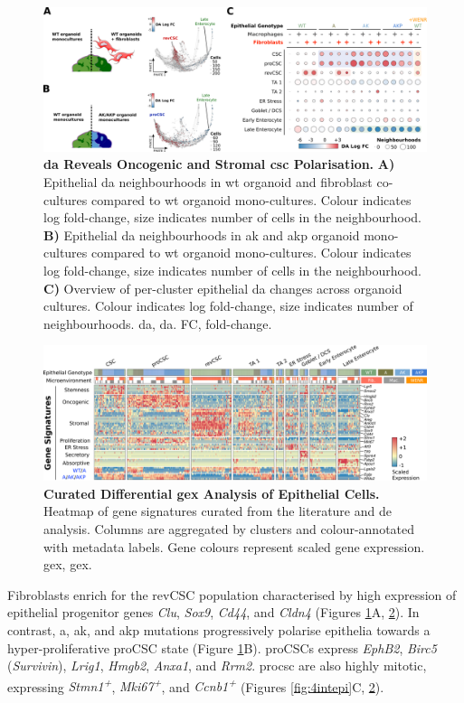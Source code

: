 \begin{figure}
    \centering
    \includegraphics{04seq/figs/4SEQ_DA.png}
    \caption{\textbf{\acrshort{da} Reveals Oncogenic and Stromal \acrshort{csc} Polarisation.} \textbf{A)} Epithelial \acrshort{da} neighbourhoods in \acrshort{wt} organoid and fibroblast co-cultures compared to \acrshort{wt} organoid mono-cultures. Colour indicates log fold-change, size indicates number of cells in the neighbourhood. \textbf{B)} Epithelial \acrshort{da} neighbourhoods in \acrshort{ak} and \acrshort{akp} organoid mono-cultures compared to \acrshort{wt} organoid mono-cultures. Colour indicates log fold-change, size indicates number of cells in the neighbourhood. \textbf{C)} Overview of per-cluster epithelial \acrshort{da} changes across organoid cultures. Colour indicates log fold-change, size indicates number of neighbourhoods. \acrshort{da}, \acrlong{da}. FC, fold-change.}
    \label{fig:4da}
\end{figure}
\begin{figure}
    \centering
    \includegraphics{04seq/figs/4SEQ_DE.png}
    \caption{\textbf{Curated Differential \acrshort{gex} Analysis of Epithelial Cells.} Heatmap of gene signatures curated from the literature and \acrshort{de} analysis. Columns are aggregated by clusters and colour-annotated with metadata labels. Gene colours represent scaled gene expression. \acrshort{gex}, \acrlong{gex}.}
    \label{fig:4de}
\end{figure}

Fibroblasts enrich for the revCSC population characterised by high expression of epithelial progenitor genes \emph{Clu}, \emph{Sox9}, \emph{Cd44}, and \emph{Cldn4} (Figures \ref{fig:4da}A, \ref{fig:4de}). In contrast, \acrshort{a}, \acrshort{ak}, and \acrshort{akp} mutations progressively polarise epithelia towards a hyper-proliferative proCSC state (Figure \ref{fig:4da}B). proCSCs express \textit{EphB2}, \textit{Birc5} (\textit{Survivin}), \textit{Lrig1}, \textit{Hmgb2}, \textit{Anxa1}, and \textit{Rrm2}. \acrshort{procsc} are also highly mitotic, expressing \textit{Stmn1\textsuperscript{+}}, \textit{Mki67\textsuperscript{+}}, and \textit{Ccnb1\textsuperscript{+}} (Figures \ref{fig:4intepi}C, \ref{fig:4de}). 

